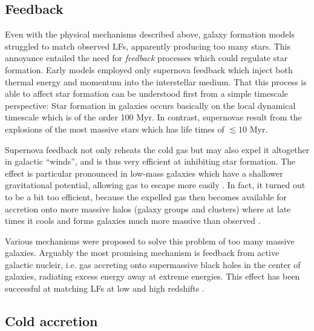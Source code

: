 \documentclass[useAMS]{aa}
\begin{document}
\subsection{Feedback}
\label{sec:feedback}

Even with the physical mechanisms described above, galaxy formation models struggled to match observed LFs, apparently producing too many stars.
This annoyance entailed the need for \emph{feedback} processes which could regulate star formation.
Early models \citep[e.g.][]{White1991,Somerville1999,Efstathiou2000} employed only supernova feedback which inject both thermal energy and momentum into the interstellar medium. 
That this process is able to affect star formation can be understood first from a simple timescale perspective:
Star formation in galaxies occurs basically on the local dynamical timescale which is of the order 100 Myr. In contrast, supernovae result from the explosions of the most massive stars which has life times of $\lesssim 10$ Myr.

Supernova feedback not only reheats the cold gas but may also expel it altogether in galactic ``winds'', and is thus very efficient at inhibiting star formation. The effect is particular pronounced in low-mass galaxies which have a shallower gravitational potential, allowing gas to escape more easily \citep{Dekel1986,Kauffmann1993,Natarajan1999}.
In fact, it turned out to be a bit too efficient, because the expelled gas then becomes available for accretion onto more massive halos (galaxy groups and clusters) where at late times it cools and forms galaxies much more massive than observed \citep{Benson2003}.

Various mechanisms were proposed to solve this problem of too many massive galaxies.
Arguably the most promising mechanism is feedback from active galactic nucleir, i.e. gas accreting onto supermassive black holes in the center of galaxies, radiating excess energy away at extreme energies.
This effect has been successful at matching LFs at low and high redshifts \citep[e.g.][]{Croton2006,Bower2006,Somerville2008,McCarthy2011}.

\subsection{Cold accretion}
\label{sec:coldmode}
\end{document}
